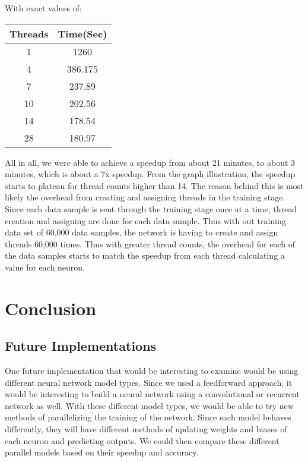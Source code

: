 \documentclass[twoside,twocolumn]{article}
\begin{document}
With exact values of:\\
\begin{center}
\begin{tabular}{||c c||} 
 \hline
 Threads & Time(Sec) \\ [0.5ex] 
 \hline\hline
 1 & 1260 \\ 
 \hline
 4 & 386.175  \\
 \hline
 7 & 237.89  \\
 \hline
 10 & 202.56  \\
 \hline
 14 & 178.54  \\ 
 \hline
 28 & 180.97 \\ [1ex] 
 \hline
\end{tabular}
\end{center}
 All in all, we were able to achieve a speedup from about 21 minutes, to about 3 minutes, which is about a 7x speedup. From the graph illustration, the speedup starts to plateau for thread counts higher than 14. The reason behind this is most likely the overhead from creating and assigning threads in the training stage. Since each data sample is sent through the training stage once at a time, thread creation and assigning are done for each data sample. Thus with out training data set of 60,000 data samples, the network is having to create and assign threads 60,000 times. Thus with greater thread counts, the overhead for each of the data samples starts to match the speedup from each thread calculating a value for each neuron. \\
 
 \section{Conclusion}
 \subsection{Future Implementations}
 One future implementation that would be interesting to examine would be using different neural network model types. Since we used a feedforward approach, it would be interesting to build a neural network using a convolutional or recurrent network as well. With these different model types, we would be able to try new methods of parallelizing the training of the network. Since each model behaves differently, they will have different methods of updating weights and biases of each neuron and predicting outputs. We could then compare these different parallel models based on their speedup and accuracy. \\
 
\end{document}
